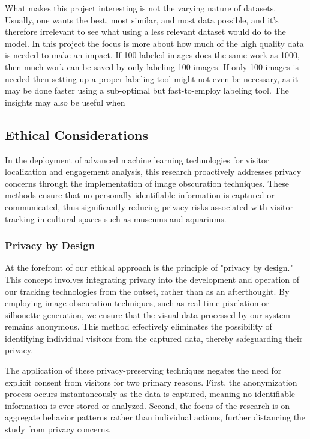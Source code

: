 What makes this project interesting is not the varying nature of datasets. Usually, one wants the best, most similar, and most data possible, and it's therefore irrelevant to see what using a less relevant dataset would do to the model. In this project the focus is more about how much of the high quality data is needed to make an impact. If 100 labeled images does the same work as 1000, then much work can be saved by only labeling 100 images. If only 100 images is needed then setting up a proper labeling tool might not even be necessary, as it may be done faster using a sub-optimal but fast-to-employ labeling tool. The insights may also be useful when 

\subsection{Ethical Considerations}
In the deployment of advanced machine learning technologies for visitor localization and engagement analysis, this research proactively addresses privacy concerns through the implementation of image obscuration techniques. These methods ensure that no personally identifiable information is captured or communicated, thus significantly reducing privacy risks associated with visitor tracking in cultural spaces such as museums and aquariums.

\subsubsection{Privacy by Design}
At the forefront of our ethical approach is the principle of "privacy by design." This concept involves integrating privacy into the development and operation of our tracking technologies from the outset, rather than as an afterthought. By employing image obscuration techniques, such as real-time pixelation or silhouette generation, we ensure that the visual data processed by our system remains anonymous. This method effectively eliminates the possibility of identifying individual visitors from the captured data, thereby safeguarding their privacy.

The application of these privacy-preserving techniques negates the need for explicit consent from visitors for two primary reasons. First, the anonymization process occurs instantaneously as the data is captured, meaning no identifiable information is ever stored or analyzed. Second, the focus of the research is on aggregate behavior patterns rather than individual actions, further distancing the study from privacy concerns.


